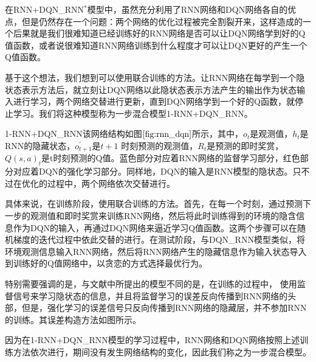 在RNN+DQN_RNN$^{*}$模型中，虽然充分利用了RNN网络和DQN网络各自的优点，但是仍然存在一个问题：两个网络的优化过程被完全割裂开来，这样造成的一个后果就是我们很难知道已经训练好的RNN网络是否可以让DQN网络学到好的Q值函数，或者说很难知道RNN网络训练到什么程度才可以让DQN更好的产生一个Q值函数。

基于这个想法，我们想到可以使用联合训练的方法。让RNN网络在每学到一个隐状态表示方法后，就立刻让DQN网络以此隐状态表示方法产生的输出作为状态输入进行学习，两个网络交替进行更新，直到DQN网络学到一个好的Q函数，就停止学习。我们将这种模型称为一步混合模型1-RNN+DQN\_RNN。



1-RNN+DQN_RNN该网络结构如图$\ref{fig:rnn_dqn}$所示，其中，$o_{t}$是观测值，$h_{t}$是RNN的隐藏状态，$o_{t+1}^{'}$是$t+1$ 时刻预测的观测值，$R_{t}$是预测的即时奖赏，$Q(s,a)_{t}$是t时刻预测的Q值。蓝色部分对应着RNN网络的监督学习部分，红色部分对应着DQN的强化学习部分。同样地，DQN的输入是RNN模型的隐状态。只不过在优化的过程中，两个网络依次交替进行。

具体来说，在训练阶段，使用联合训练的方法。首先，在每一个时刻，通过预测下一步的观测值和即时奖赏来训练RNN网络，然后将此时训练得到的环境的隐含信息作为DQN的输入，再通过DQN网络来逼近学习Q值函数。这两个步骤可以在随机梯度的迭代过程中依此交替的进行。在测试阶段，与DQN\_RNN模型类似，将环境观测信息输入RNN网络，然后将RNN网络产生的隐藏信息作为输入状态导入到训练好的Q值网络中，以贪恋的方式选择最优行为。

特别需要强调的是，与文献\citep{hausknecht2015deep,narasimhan2015language}中所提出的模型不同的是，在训练的过程中，
使用监督信号来学习隐状态的信息，并且将监督学习的误差反向传播到RNN网络的头部，但是，强化学习的误差信号只反向传播到RNN网络的隐藏层，并不参加RNN的训练。其误差构造方法如图所示。

因为在1-RNN+DQN\_RNN模型的学习过程中，RNN网络和DQN网络按照上述训练方法依次进行，期间没有发生网络结构的变化，因此我们称之为一步混合模型。


